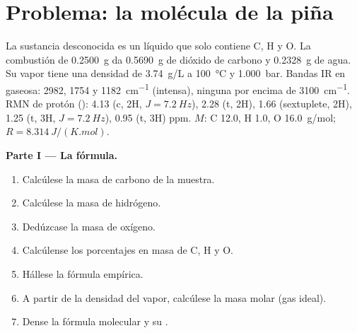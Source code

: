 \section{Problema: la molécula de la piña}

\begin{problem}
\label{pb:b1:structure-spectroscopy:1}
La sustancia desconocida es un líquido que solo contiene C, H y O. La
combustión de \qty{0.2500}{g} da \qty{0.5690}{g} de dióxido de carbono y
\qty{0.2328}{g} de agua. Su vapor tiene una densidad de \qty{3.74}{g/L} a
\qty{100}{\celsius} y \qty{1.000}{bar}. Bandas IR en  gaseosa: 2982,
1754 y \qty{1182}{cm^{-1}} (intensa), ninguna por encima de
\qty{3100}{cm^{-1}}. RMN de protón (): 4.13 (c, 2H, $J = \qty{7.2}{Hz}$),
2.28 (t, 2H), 1.66 (sextuplete, 2H), 1.25 (t, 3H, $J = \qty{7.2}{Hz}$),
0.95 (t, 3H) ppm. $M$: C 12.0, H 1.0, O \qty{16.0}{g/mol}; $R =
\qty{8.314}{J/(K.mol)}$.

\begin{center}
\end{center}

\medskip
\noindent\textbf{Parte I --- La fórmula.}
\begin{enumerate}
  \item Calcúlese la masa de carbono de la muestra.
  \item Calcúlese la masa de hidrógeno.
  \item Dedúzcase la masa de oxígeno.
  \item Calcúlense los porcentajes en masa de C, H y O.
  \item Hállese la fórmula empírica.
  \item A partir de la densidad del vapor, calcúlese la masa molar (gas
        ideal).
  \item Dense la fórmula molecular y su .
\end{enumerate}


\end{problem}

